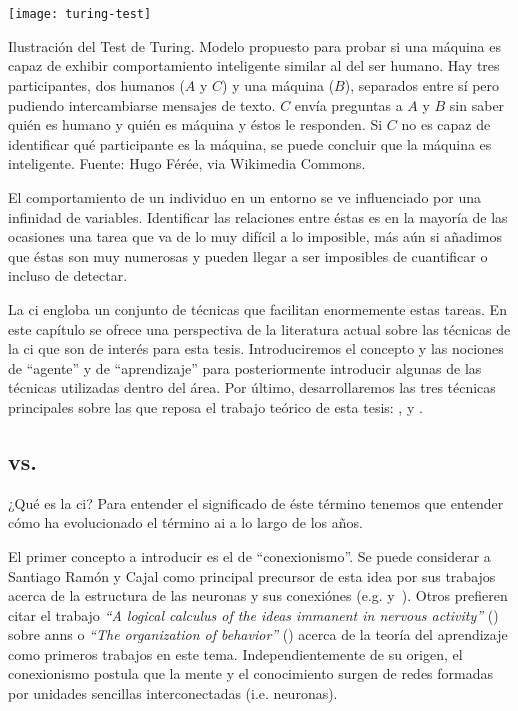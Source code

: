 \chapter{}
\label{ch:sota-ci}

\begin{marginfigure}
	\texttt{[image: turing-test]}
	\caption{Ilustración del Test de Turing. Modelo propuesto para probar si una máquina es capaz de exhibir comportamiento inteligente similar al del ser humano. Hay tres participantes, dos humanos ($A$ y $C$) y una máquina ($B$), separados entre sí pero pudiendo intercambiarse mensajes de texto. $C$ envía preguntas a $A$ y $B$ sin saber quién es humano y quién es máquina y éstos le responden. Si $C$ no es capaz de identificar qué participante es la máquina, se puede concluir que la máquina es inteligente. Fuente: Hugo Férée, via Wikimedia Commons.}
	\label{fig:turing-test}
\end{marginfigure}

El comportamiento de un individuo en un entorno se ve influenciado por una infinidad de variables. Identificar las relaciones entre éstas es en la mayoría de las ocasiones una tarea que va de lo muy difícil a lo imposible, más aún si añadimos que éstas son muy numerosas y pueden llegar a ser imposibles de cuantificar o incluso de detectar.

La \ac{ci} engloba un conjunto de técnicas que facilitan enormemente estas tareas. En este capítulo se ofrece una perspectiva de la literatura actual sobre las técnicas de la \gls{ci} que son de interés para esta tesis. Introduciremos el concepto y las nociones de \enquote{agente} y de \enquote{aprendizaje} para posteriormente introducir algunas de las técnicas utilizadas dentro del área. Por último, desarrollaremos las tres técnicas principales sobre las que reposa el trabajo teórico de esta tesis: ,  y .

\section{ vs. }

¿Qué es la \ac{ci}? Para entender el significado de éste término tenemos que entender cómo ha evolucionado el término \ac{ai} a lo largo de los años.

El primer concepto a introducir es el de \enquote{conexionismo}. Se puede considerar a Santiago Ramón y Cajal como principal precursor de esta idea por sus trabajos acerca de la estructura de las neuronas y sus conexiónes (e.g. \cite{y1888estructura} y~\cite{ramon1904textura}). Otros prefieren citar el trabajo \textit{\enquote{A logical calculus of the ideas immanent in nervous activity}} (\cite{McCulloch1943}) sobre \glspl{ann} o \textit{\enquote{The organization of behavior}} (\cite{hebb19680}) acerca de la teoría del aprendizaje como primeros trabajos en este tema. Independientemente de su origen, el conexionismo postula que la mente y el conocimiento surgen de redes formadas por unidades sencillas interconectadas (i.e. neuronas).

